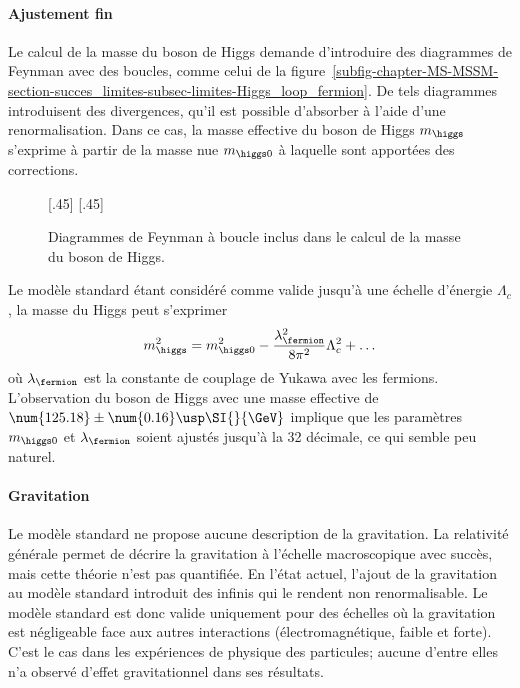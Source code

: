 \paragraph{Ajustement fin}
Le calcul de la masse du boson de Higgs demande d'introduire des diagrammes de Feynman avec des boucles, comme celui de la figure~\ref{subfig-chapter-MS-MSSM-section-succes_limites-subsec-limites-Higgs_loop_fermion}.
De tels diagrammes introduisent des divergences, qu'il est possible d'absorber à l'aide d'une renormalisation.
Dans ce cas, la masse effective du boson de Higgs $m_{\higgs}$ s'exprime à partir de la masse \og nue \fg{} $m_{\higgs 0}$ à laquelle sont apportées des corrections.
\begin{figure}[h]
\centering
{}[.45\textwidth]
{}
\hfill
{}[.45\textwidth]
{}

\caption[Diagrammes de Feynman inclus dans le calcul de la masse du boson de Higgs.]{Diagrammes de Feynman à boucle inclus dans le calcul de la masse du boson de Higgs.}
\label{fig-chapter-MS-MSSM-section-succes_limites-subsec-limites-Higgs_loops}
\end{figure}
\par Le modèle standard étant considéré comme valide jusqu'à une échelle d'énergie $\Lambda_c$, la masse du Higgs peut s'exprimer
\begin{equation}
m_{\higgs}^2 = m_{\higgs 0}^2 - \frac{\lambda_{\fermion}^2}{8\pi^2} \Lambda_c^2 + \ldots
\end{equation}
où $\lambda_{\fermion}$ est la constante de couplage de Yukawa avec les fermions.
L'observation du boson de Higgs avec une masse effective de $\num{125.18}\pm\num{0.16}\usp\SI{}{\GeV}$ implique que les paramètres $ m_{\higgs 0}$ et $\lambda_{\fermion}$ soient ajustés jusqu'à la 32 décimale, ce qui semble peu naturel.
\paragraph{Gravitation}
Le modèle standard ne propose aucune description de la gravitation.
La relativité générale permet de décrire la gravitation à l'échelle macroscopique avec succès, mais cette théorie n'est pas quantifiée.
En l'état actuel, l'ajout de la gravitation au modèle standard introduit des infinis qui le rendent non renormalisable.
Le modèle standard est donc valide uniquement pour des échelles où la gravitation est négligeable face aux autres interactions (électromagnétique, faible et forte).
C'est le cas dans les expériences de physique des particules; aucune d'entre elles n'a observé d'effet gravitationnel dans ses résultats.
